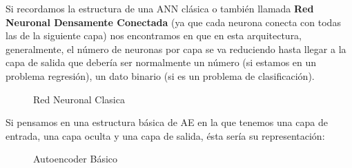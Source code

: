 \documentclass[
  a4paper,
  DIV=11,
  numbers=noendperiod]{scrreprt}
\begin{document}
Si recordamos la estructura de una ANN clásica o también llamada
\textbf{Red Neuronal Densamente Conectada} (ya que cada neurona conecta
con todas las de la siguiente capa) nos encontramos en que en esta
arquitectura, generalmente, el número de neuronas por capa se va
reduciendo hasta llegar a la capa de salida que debería ser normalmente
un número (si estamos en un problema regresión), un dato binario (si es
un problema de clasificación).

\begin{figure}


\caption{\label{fig-redneuronal}Red Neuronal Clasica}

\end{figure}%

Si pensamos en una estructura básica de AE en la que tenemos una capa de
entrada, una capa oculta y una capa de salida, ésta sería su
representación:

\begin{figure}


\caption{\label{fig-autoencoder_basico}Autoencoder Básico}

\end{figure}%
\end{document}
